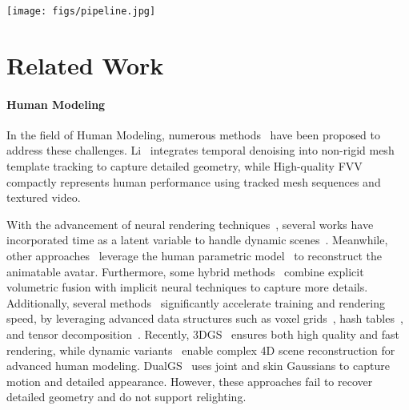 
 \begin{figure*} [ht]
  \label{fig:pipeline}
  \centering
  \texttt{[image: figs/pipeline.jpg]}
  \vspace{-15pt}
  \label{fig_pipeline}
  \vspace{-7pt}
\end{figure*}
\section{Related Work} 
\paragraph{Human Modeling}
In the field of Human Modeling, numerous methods~\cite{sun2021neural,suo2021neuralhumanfvv,zhao2022human,fridovich2023k} have been proposed to address these challenges. Li~\cite{Temporally} integrates temporal denoising into non-rigid mesh template tracking to capture detailed geometry, while High-quality FVV~\cite{collet2015high} compactly represents human performance using tracked mesh sequences and textured video.

With the advancement of neural rendering techniques~\cite{nerf}, several works have incorporated time as a latent variable to handle dynamic scenes~\cite{pumarola2021d,xian2021space,tretschk2021non}. Meanwhile, other approaches~\cite{peng2021neural,weng2022humannerf,zheng2023avatarrex,habermann2023hdhumans,sun2024real,zhu2024trihuman,pang2024ash} leverage the human parametric model~\cite{loper2023smpl} to reconstruct the animatable avatar. Furthermore, some hybrid methods~\cite{yu2021function4d, jiang2022neuralhofusion,jiang2023instant} combine explicit volumetric fusion with implicit neural techniques to capture more details. 
Additionally, several methods~\cite{wang2023neural,icsik2023humanrf,jiang2023instant,shao2023tensor4d,song2023nerfplayer} significantly accelerate training and rendering speed, by leveraging advanced data structures such as voxel grids~\cite{fridovich2022plenoxels}, hash tables~\cite{muller2022instant}, and tensor decomposition~\cite{chen2022tensorf}.
Recently, 3DGS~\cite{gaussiansplatting} ensures both high quality and fast rendering, while dynamic variants~\cite{sun20243dgstream,wu20244d,luiten2024dynamic,huang2024sc,yang20244d,jiang2024hifi4g,duan20244d,xu2024representing,li2023spacetime} enable complex 4D scene reconstruction for advanced human modeling. DualGS~\cite{jiang2024robust} uses joint and skin Gaussians to capture motion and detailed appearance. However, these approaches fail to recover detailed geometry and do not support relighting.

